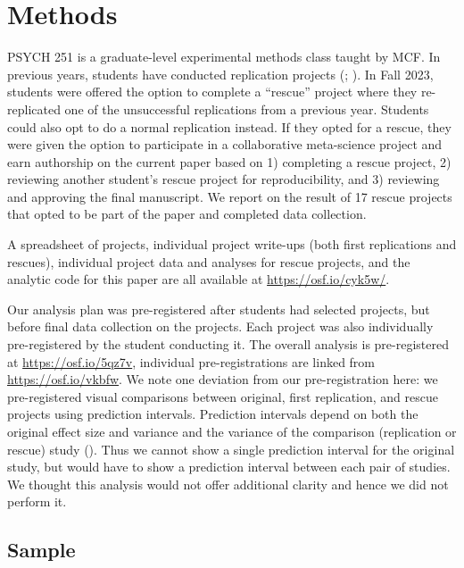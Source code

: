 \documentclass[
  english,
  a4paper,
]{article}
\begin{document}
\section{Methods}\label{methods}

PSYCH 251 is a graduate-level experimental methods class taught by MCF.
In previous years, students have conducted replication projects (; ).
In Fall 2023, students were offered the option to complete a ``rescue'' project where they re-replicated one of the unsuccessful replications from a previous year.
Students could also opt to do a normal replication instead.
If they opted for a rescue, they were given the option to participate in a collaborative meta-science project and earn authorship on the current paper based on 1) completing a rescue project, 2) reviewing another student's rescue project for reproducibility, and 3) reviewing and approving the final manuscript.
We report on the result of 17 rescue projects that opted to be part of the paper and completed data collection.

A spreadsheet of projects, individual project write-ups (both first replications and rescues), individual project data and analyses for rescue projects, and the analytic code for this paper are all available at \url{https://osf.io/cyk5w/}.

Our analysis plan was pre-registered after students had selected projects, but before final data collection on the projects.
Each project was also individually pre-registered by the student conducting it.
The overall analysis is pre-registered at \url{https://osf.io/5qz7v}, individual pre-registrations are linked from \url{https://osf.io/vkbfw}.
We note one deviation from our pre-registration here: we pre-registered visual comparisons between original, first replication, and rescue projects using prediction intervals.
Prediction intervals depend on both the original effect size and variance and the variance of the comparison (replication or rescue) study ().
Thus we cannot show a single prediction interval for the original study, but would have to show a prediction interval between each pair of studies.
We thought this analysis would not offer additional clarity and hence we did not perform it.

\subsection{Sample}\label{sample}
\end{document}
